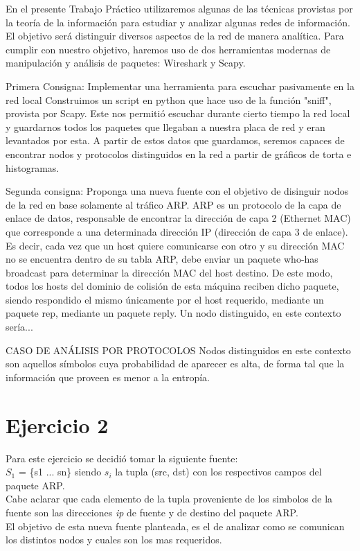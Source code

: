 \documentclass[final,narroweqnarray,inline]{ieee}
\begin{document}
\PARstart En el presente Trabajo Práctico utilizaremos algunas de las técnicas
provistas por la teoría de la información para estudiar y analizar algunas
redes de información. El objetivo será distinguir diversos aspectos de la
red de manera analítica. Para cumplir con nuestro objetivo, haremos uso de
dos herramientas modernas de manipulación y análisis de paquetes: Wireshark
y Scapy.

\medskip
Primera Consigna:
Implementar una herramienta para escuchar pasivamente en la red local
Construimos un script en python que hace uso de la
función "sniff", provista por Scapy. Este nos permitió escuchar durante
cierto tiempo la red local y guardarnos todos los paquetes que llegaban a
nuestra placa de red y eran levantados por esta. A partir de estos datos
que guardamos, seremos capaces de encontrar  nodos y protocolos
distinguidos en la red a partir de gráficos de torta e histogramas.

\medskip
Segunda consigna:
Proponga una nueva fuente con el objetivo de disinguir nodos de la red
en base solamente al tráfico ARP. 
ARP es un protocolo de la capa de enlace de datos, responsable de encontrar
la dirección de capa 2 (Ethernet MAC) que corresponde a una determinada
dirección IP (dirección de capa 3 de enlace). Es decir, cada vez que un host
quiere comunicarse con otro y su dirección MAC no se encuentra dentro de su
tabla ARP, debe enviar un paquete who-has broadcast para determinar la dirección MAC
del host destino. De este modo, todos los hosts del dominio de colisión de
esta máquina reciben dicho paquete, siendo respondido el mismo únicamente
por el host requerido, mediante un paquete rep, mediante un paquete reply.
Un nodo distinguido, en este contexto sería... 

\medskip
CASO DE ANÁLISIS POR PROTOCOLOS
Nodos distinguidos en este contexto son aquellos símbolos cuya probabilidad
de aparecer es alta, de forma tal que la información que proveen es menor a
la entropía. 



\section{Ejercicio 2}
Para este ejercicio se decidi\'o tomar la siguiente fuente: \\ 
$S_{1}$ = \{s1 ... sn\} siendo $s_{i}$ la tupla (src, dst) con los respectivos campos del paquete ARP. \\
Cabe aclarar que cada elemento de la tupla proveniente de los simbolos de la fuente son las direcciones \textit{ip}
de fuente y de destino del paquete ARP. \\
El objetivo de esta nueva fuente planteada, es el de analizar como se comunican los distintos nodos
y cuales son los mas requeridos. 
\end{document}
